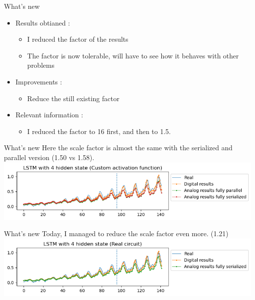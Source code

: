 \documentclass[table]{beamer}
\begin{document}
  \begin{frame}{What's new}
    \begin{itemize}
      \item Results obtianed :
        \begin{itemize}
            \color{text}
          \item I reduced the factor of the results
          \item The factor is now tolerable, will have to see how it behaves with other problems
        \end{itemize}
      \item Improvements :
        \begin{itemize}
            \color{text}
          \item Reduce the still existing factor
        \end{itemize}
      \item Relevant information :
        \begin{itemize}
            \color{text}
          \item I reduced the factor to 16 first, and then to 1.5.
        \end{itemize}
    \end{itemize}
  \end{frame}

  \begin{frame}{What's new}
    Here the scale factor is almost the same with the serialized and parallel version (1.50 vs 1.58).
    \includegraphics[width=\textwidth]{output/factor1.5.png}
  \end{frame}

  \begin{frame}{What's new}
    Today, I managed to reduce the scale factor even more. (1.21)
    \includegraphics[width=\textwidth]{output/factor1.2.png}
  \end{frame}
\end{document}
